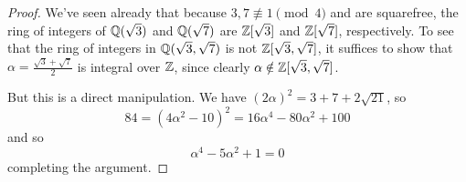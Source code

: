 \begin{proof}
	We've seen already that because $3,7 \not\equiv 1 \pmod{4}$ and are squarefree, the ring of integers of $\mathbb{Q}(\sqrt{3})$ and $\mathbb{Q}(\sqrt{7})$ are $\mathbb{Z}[\sqrt{3}]$ and $\mathbb{Z}[\sqrt{7}]$, respectively. To see that the ring of integers in $\mathbb{Q}(\sqrt{3},\sqrt{7})$ is not $\mathbb{Z}[\sqrt{3},\sqrt{7}]$, it suffices to show that $\alpha = \frac{\sqrt{3}+\sqrt{7}}{2}$ is integral over $\mathbb{Z}$, since clearly $\alpha \notin \mathbb{Z}[\sqrt{3},\sqrt{7}]$.
	
	But this is a direct manipulation. We have $(2\alpha)^2 = 3+7+2\sqrt{21}$, so
	\[ 84 = (4\alpha^2-10)^2 = 16\alpha^4-80\alpha^2+100 \]
	and so
	\[ \alpha^4-5\alpha^2+1 = 0 \]
	completing the argument.
\end{proof}
